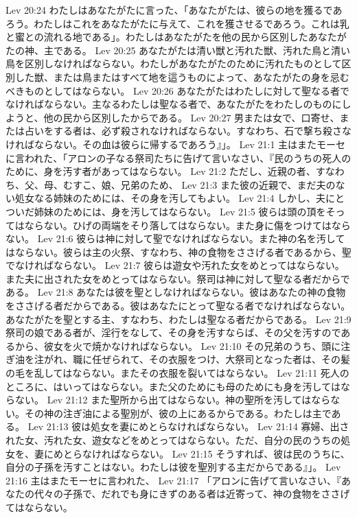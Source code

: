 Lev 20:24  わたしはあなたがたに言った、「あなたがたは、彼らの地を獲るであろう。わたしはこれをあなたがたに与えて、これを獲させるであろう。これは乳と蜜との流れる地である」。わたしはあなたがたを他の民から区別したあなたがたの神、主である。
Lev 20:25  あなたがたは清い獣と汚れた獣、汚れた鳥と清い鳥を区別しなければならない。わたしがあなたがたのために汚れたものとして区別した獣、または鳥またはすべて地を這うものによって、あなたがたの身を忌むべきものとしてはならない。
Lev 20:26  あなたがたはわたしに対して聖なる者でなければならない。主なるわたしは聖なる者で、あなたがたをわたしのものにしようと、他の民から区別したからである。
Lev 20:27  男または女で、口寄せ、または占いをする者は、必ず殺されなければならない。すなわち、石で撃ち殺さなければならない。その血は彼らに帰するであろう』」。
Lev 21:1  主はまたモーセに言われた、「アロンの子なる祭司たちに告げて言いなさい、『民のうちの死人のために、身を汚す者があってはならない。
Lev 21:2  ただし、近親の者、すなわち、父、母、むすこ、娘、兄弟のため、
Lev 21:3  また彼の近親で、まだ夫のない処女なる姉妹のためには、その身を汚してもよい。
Lev 21:4  しかし、夫にとついだ姉妹のためには、身を汚してはならない。
Lev 21:5  彼らは頭の頂をそってはならない。ひげの両端をそり落してはならない。また身に傷をつけてはならない。
Lev 21:6  彼らは神に対して聖でなければならない。また神の名を汚してはならない。彼らは主の火祭、すなわち、神の食物をささげる者であるから、聖でなければならない。
Lev 21:7  彼らは遊女や汚れた女をめとってはならない。また夫に出された女をめとってはならない。祭司は神に対して聖なる者だからである。
Lev 21:8  あなたは彼を聖としなければならない。彼はあなたの神の食物をささげる者だからである。彼はあなたにとって聖なる者でなければならない。あなたがたを聖とする主、すなわち、わたしは聖なる者だからである。
Lev 21:9  祭司の娘である者が、淫行をなして、その身を汚すならば、その父を汚すのであるから、彼女を火で焼かなければならない。
Lev 21:10  その兄弟のうち、頭に注ぎ油を注がれ、職に任ぜられて、その衣服をつけ、大祭司となった者は、その髪の毛を乱してはならない。またその衣服を裂いてはならない。
Lev 21:11  死人のところに、はいってはならない。また父のためにも母のためにも身を汚してはならない。
Lev 21:12  また聖所から出てはならない。神の聖所を汚してはならない。その神の注ぎ油による聖別が、彼の上にあるからである。わたしは主である。
Lev 21:13  彼は処女を妻にめとらなければならない。
Lev 21:14  寡婦、出された女、汚れた女、遊女などをめとってはならない。ただ、自分の民のうちの処女を、妻にめとらなければならない。
Lev 21:15  そうすれば、彼は民のうちに、自分の子孫を汚すことはない。わたしは彼を聖別する主だからである』」。
Lev 21:16  主はまたモーセに言われた、
Lev 21:17  「アロンに告げて言いなさい、『あなたの代々の子孫で、だれでも身にきずのある者は近寄って、神の食物をささげてはならない。
